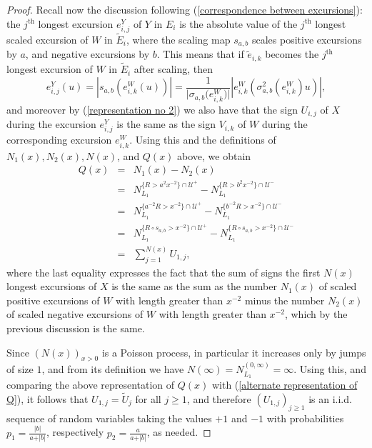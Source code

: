 \documentclass[reqno]{amsart}
\theoremstyle{definition}
\theoremstyle{remark}
\numberwithin{equation}{section}
\begin{document}
\begin{proof}
Recall now the discussion following (\ref{correspondence between excursions}): the $j^\text{th}$ longest excursion $e^Y_{i,j}$ of $Y$ in $E_i$ is the absolute value of the $j^\text{th}$ longest scaled excursion of $W$ in $\widetilde{E}_{i}$, where the scaling map $s_{a,b}$ scales positive excursions by $a$, and negative excursions by $b$. This means that if $\widetilde{e}_{i,k}$ becomes the $j^\text{th}$ longest excursion of $W$ in $\widetilde{E}_i$ after scaling, then $$e^Y_{i,j}(u)=\left\vert s_{a,b}\left(e^W_{i,k}(u)\right)\right\vert=\frac{1}{\big\vert \sigma_{a,b} {\big(e^W_{i,k}\big)}\big\vert} \left \vert e_{i,k}^W \left(\sigma_{a,b}^2\left(e_{i,k}^W\right) u\right)\right \vert,$$ and moreover by (\ref{representation no 2}) we also have 
that the sign $U_{i,j}$ of $X$ during the excursion $e^Y_{i,j}$  is the same as the sign $V_{i,k}$ of $W$ during the corresponding excursion $e^W_{i,k}$. Using this and the definitions of $N_1(x), N_2(x), N(x)$, and $Q(x)$ above, we obtain
\begin{eqnarray*}
Q(x)&=&N_1(x)-N_2(x)\\
&=&N_{L_1}^{\{R>a^2x^{-2}\}\cap \mathcal{U}^+}-N_{L_1}^{\{R>b^2x^{-2}\}\cap\mathcal{U}^-}\\
&=&N_{L_1}^{\{a^{-2} R>x^{-2}\}\cap\mathcal{U}^+}-N_{L_1}^{\{b^{-2}R>x^{-2}\}\cap\mathcal{U}^-}\\
&=&N_{L_1}^{\{R\circ s_{a,b}>x^{-2}\}\cap\mathcal{U}^+}-N_{L_1}^{\{R\circ s_{a,b}>x^{-2}\}\cap\mathcal{U}^-}\\
&=&\sum_{j=1}^{N(x)}U_{1,j},
\end{eqnarray*}
where the last equality expresses the fact that the sum of signs the first $N(x)$ longest excursions of $X$ is the same as the sum as the number $N_1(x)$ of scaled positive excursions of $W$ with length greater than $x^{-2}$ minus the number $N_2(x)$ of scaled negative excursions of $W$ with length greater than $x^{-2}$, which by the previous discussion is the same.

Since $(N(x))_{x>0}$ is a Poisson process, in particular it increases only by jumps of size $1$, and from its definition we have $N(\infty)=N_{L_1}^{(0,\infty)}=\infty$. Using this, and comparing the above representation of $Q(x)$ with (\ref{alternate representation of Q}), it follows that $U_{1,j}=\widetilde{U}_j$ for all $j\geq 1$, and therefore $(U_{1,j})_{j\geq 1}$ is an i.i.d. sequence of random variables taking the values $+1$ and $-1$ with probabilities $p_1=\frac{\vert b \vert}{a+\vert b\vert}$, respectively $p_2=\frac{a}{a+\vert b\vert}$, as needed.


\end{proof}
\end{document}
